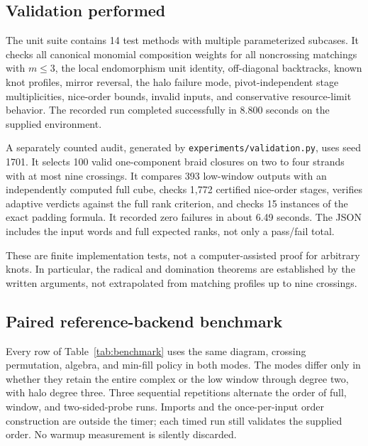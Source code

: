 \documentclass[11pt]{article}
\theoremstyle{definition}\newtheorem{definition}[theorem]{Definition}
\theoremstyle{remark}\newtheorem{remark}[theorem]{Remark}
\begin{document}
\subsection{Validation performed}
The unit suite contains 14 test methods with multiple parameterized subcases. It checks all canonical monomial composition weights for all noncrossing matchings with $m\leq3$, the local endomorphism unit identity, off-diagonal backtracks, known knot profiles, mirror reversal, the halo failure mode, pivot-independent stage multiplicities, nice-order bounds, invalid inputs, and conservative resource-limit behavior. The recorded run completed successfully in 8.800 seconds on the supplied environment.

A separately counted audit, generated by \texttt{experiments/validation.py}, uses seed 1701. It selects 100 valid one-component braid closures on two to four strands with at most nine crossings. It compares 393 low-window outputs with an independently computed full cube, checks 1,772 certified nice-order stages, verifies adaptive verdicts against the full rank criterion, and checks 15 instances of the exact padding formula. It recorded zero failures in about 6.49 seconds. The JSON includes the input words and full expected ranks, not only a pass/fail total.

These are finite implementation tests, not a computer-assisted proof for arbitrary knots. In particular, the radical and domination theorems are established by the written arguments, not extrapolated from matching profiles up to nine crossings.

\subsection{Paired reference-backend benchmark}
Every row of Table~\ref{tab:benchmark} uses the same diagram, crossing permutation, algebra, and min-fill policy in both modes. The modes differ only in whether they retain the entire complex or the low window through degree two, with halo degree three. Three sequential repetitions alternate the order of full, window, and two-sided-probe runs. Imports and the once-per-input order construction are outside the timer; each timed run still validates the supplied order. No warmup measurement is silently discarded.

\begin{table}[htbp]
\centering\small

\caption{Reference backend only. Times are medians in seconds. ``Ratio'' is the median of the three paired full/window ratios, not necessarily the ratio of medians. ``Peak ratio'' compares maximum pre-cancellation object counts, not measured resident memory. All displayed runs completed under the selected caps.}
\label{tab:benchmark}
\end{table}
\end{document}
